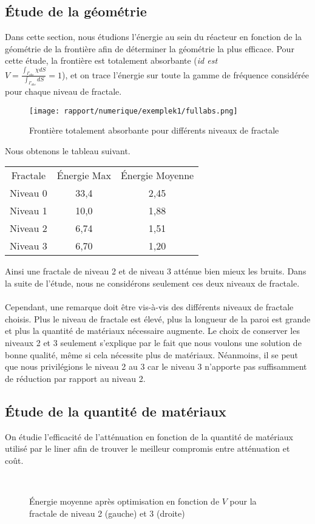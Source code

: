 \subsection{Étude de la géométrie}
Dans cette section, nous étudions l'énergie au sein du réacteur en fonction de la géométrie de la frontière afin de déterminer la géométrie la plus efficace. Pour cette étude, la frontière est totalement absorbante (\textit{id est} \\ $V = \displaystyle \frac{\int_{\Gamma_{abs}} \chi dS}{\int_{\Gamma_{abs}} dS} = 1$), et on trace l'énergie sur toute la gamme de fréquence considérée pour chaque niveau de fractale.
\begin{figure}[H]
    \centering
    \texttt{[image: rapport/numerique/exemplek1/fullabs.png]}
    \caption{Frontière totalement absorbante pour différents niveaux de fractale}
    \label{fig:enter-label}
\end{figure}
Nous obtenons le tableau suivant.
\begin{table}[H]
    \centering
    \begin{tabular}{ccc}
        Fractale & Énergie Max  & Énergie Moyenne\\
         Niveau 0& 33,4 & 2,45 & \\
         Niveau 1 & 10,0 & 1,88 & \\
         Niveau 2 & 6,74 & 1,51 & \\
         Niveau 3 & 6,70 & 1,20 & \\
    \end{tabular}
    \label{tab:my_label}
\end{table}
Ainsi une fractale de niveau 2 et de niveau 3 atténue bien mieux les bruits. Dans la suite de l'étude, nous ne considérons seulement ces deux niveaux de fractale.\\ \\
Cependant, une remarque doit être vis-à-vis des différents niveaux de fractale choisis. Plus le niveau de fractale est élevé, plus la longueur de la paroi est grande et plus la quantité de matériaux nécessaire augmente. Le choix de conserver les niveaux 2 et 3 seulement s'explique par le fait que nous voulons une solution de bonne qualité, même si cela nécessite plus de matériaux. Néanmoins, il se peut que nous privilégions le niveau 2 au 3 car le niveau 3 n'apporte pas suffisamment de réduction par rapport au niveau 2.

\subsection{Étude de la quantité de matériaux}
On étudie l'efficacité de l'atténuation en fonction de la quantité de matériaux utilisé par le liner afin de trouver le meilleur compromis entre atténuation et coût.
    \begin{figure}[H]
    \centering
    \\
    \caption{Énergie moyenne après optimisation en fonction de $V$ pour la fractale de niveau 2 (gauche) et 3 (droite)}
    \label{freq}
\end{figure}

